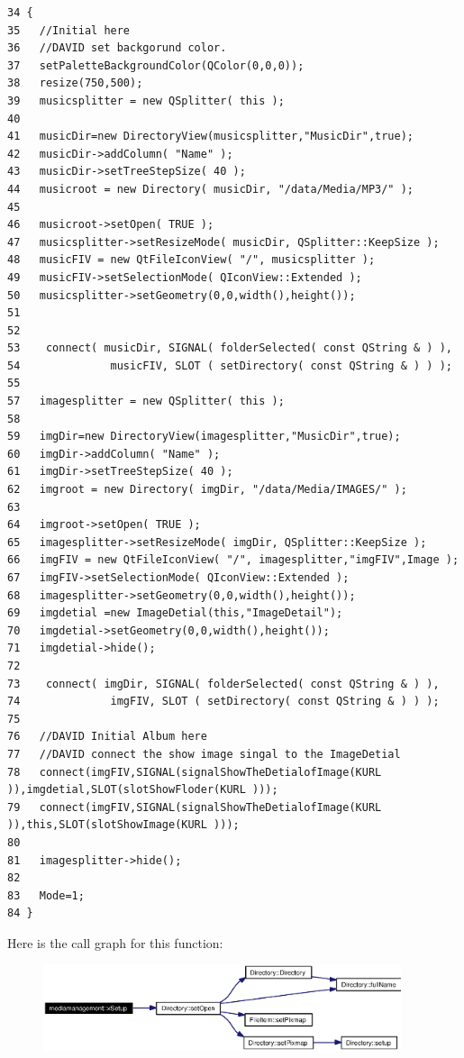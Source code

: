 \footnotesize\begin{verbatim}34 {
35   //Initial here
36   //DAVID set backgorund color.
37   setPaletteBackgroundColor(QColor(0,0,0));
38   resize(750,500);
39   musicsplitter = new QSplitter( this );
40   
41   musicDir=new DirectoryView(musicsplitter,"MusicDir",true);
42   musicDir->addColumn( "Name" );
43   musicDir->setTreeStepSize( 40 );
44   musicroot = new Directory( musicDir, "/data/Media/MP3/" );
45   
46   musicroot->setOpen( TRUE );
47   musicsplitter->setResizeMode( musicDir, QSplitter::KeepSize );
48   musicFIV = new QtFileIconView( "/", musicsplitter );
49   musicFIV->setSelectionMode( QIconView::Extended );
50   musicsplitter->setGeometry(0,0,width(),height());
51   
52   
53    connect( musicDir, SIGNAL( folderSelected( const QString & ) ),
54              musicFIV, SLOT ( setDirectory( const QString & ) ) );
55 
57   imagesplitter = new QSplitter( this );
58   
59   imgDir=new DirectoryView(imagesplitter,"MusicDir",true);
60   imgDir->addColumn( "Name" );
61   imgDir->setTreeStepSize( 40 );
62   imgroot = new Directory( imgDir, "/data/Media/IMAGES/" );
63   
64   imgroot->setOpen( TRUE );
65   imagesplitter->setResizeMode( imgDir, QSplitter::KeepSize );
66   imgFIV = new QtFileIconView( "/", imagesplitter,"imgFIV",Image );
67   imgFIV->setSelectionMode( QIconView::Extended );
68   imagesplitter->setGeometry(0,0,width(),height());
69   imgdetial =new ImageDetial(this,"ImageDetail");
70   imgdetial->setGeometry(0,0,width(),height());
71   imgdetial->hide();
72   
73    connect( imgDir, SIGNAL( folderSelected( const QString & ) ),
74              imgFIV, SLOT ( setDirectory( const QString & ) ) );
75   
76   //DAVID Initial Album here    
77   //DAVID connect the show image singal to the ImageDetial
78   connect(imgFIV,SIGNAL(signalShowTheDetialofImage(KURL )),imgdetial,SLOT(slotShowFloder(KURL )));     
79   connect(imgFIV,SIGNAL(signalShowTheDetialofImage(KURL )),this,SLOT(slotShowImage(KURL )));
80   
81   imagesplitter->hide();
82 
83   Mode=1;            
84 }
\end{verbatim}\normalsize 


Here is the call graph for this function:\begin{figure}[H]
\begin{center}
\leavevmode
\includegraphics[width=298pt]{classmediamanagement_mediamanagementd0_cgraph}
\end{center}
\end{figure}


